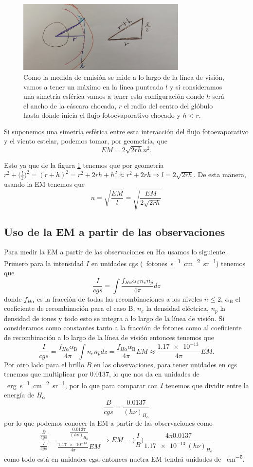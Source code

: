 \documentclass{book}
\begin{document}
\begin{figure}[h]
    \centering    \includegraphics[width=0.75\textwidth]{images Chapter 2/C2_EM.jpg}
    \caption{Como la medida de emisión se mide a lo largo de la línea de visión, vamos a tener un máximo en la línea punteada $l$ y si consideramos una simetría esférica vamos a tener esta configuración donde $h$ será el ancho de la cáscara chocada, $r$ el radio del centro del glóbulo hasta donde inicia el flujo fotoevaporativo chocado y $h<r$.}
    \label{fig:EM}
\end{figure}

Si suponemos una simetría esférica entre esta interacción del flujo fotoevaporativo y el viento estelar, podemos tomar, por geometría, que
\[EM=2\sqrt{2rh}n^2.\]


Esto ya que de la figura \ref{fig:EM} tenemos que por geometría $r^2+\Big(\frac{l}{2}\Big)^2=(r+h)^2=r^2+2rh+h^2\approx r^2+2rh\Rightarrow l=2\sqrt{2rh}$. De esta manera, usando la EM tenemos que \[n=\sqrt{\frac{EM}{l}}=\sqrt{\frac{EM}{2\sqrt{2rh}}}\] 

\subsection{Uso de la EM a partir de las observaciones}

Para medir la EM a partir de las observaciones en H$\alpha$ usamos lo siguiente. Primero para la intensidad $I$ en unidades cgs (\SI{}{fotones.s^{-1}.cm^{-2}.sr^{-1}}) tenemos que
\[\frac{I}{cgs}=\int \frac{f_{H\alpha}\alpha_\beta n_e n_p}{4\pi}dz\] donde $f_{H\alpha}$ es la fracción de todas las recombinaciones a los niveles $n\le 2$, $\alpha_\mathrm{B}$ el coeficiente de recombinación para el caso B, $n_e$ la densidad eléctrica, $n_p$ la densidad de iones y todo esto se integra a lo largo de la línea de visión. Si consideramos como constantes tanto a la fracción de fotones como al coeficiente de recombinación a lo largo de la línea de visión entonces tenemos que
\[\frac{I}{cgs}=\frac{f_{H\alpha}\alpha_\mathrm{B}}{4\pi}\int n_en_pdz=\frac{f_{H\alpha}\alpha_\mathrm{B}}{4\pi} EM \approx \frac{\SI{1.17e-13}{}}{4\pi}EM.\]
Por otro lado para el brillo $B$ en las observaciones, para tener unidades en cgs tenemos que multiplicar por 0.0137, lo que nos da en unidades de \SI{}{erg.s^{-1}.cm^{-2}.sr^{-1}}, por lo que para comparar con $I$ tenemos que dividir entre la energía de $H_\alpha$
\[\frac{B}{cgs}=\frac{0.0137}{(h\nu)_{H_\alpha}}\] por lo que podemos conocer la EM a partir de las observaciones como 
\[\frac{\frac{B}{cgs}}{\frac{I}{cgs}}=\frac{\frac{0.0137}{(h\nu)_{H_\alpha}}}{\frac{\SI{1.17e-13}{}}{4\pi}EM}\Rightarrow EM = \Big(\frac{I}{B}\Big)\frac{4\pi 0.0137}{\SI{1.17e-13}{}(h\nu)_{H_\alpha}}\] como todo está en unidades cgs, entonces nuetra EM tendrá unidades de \SI{}{cm^{-5}}.
\end{document}
